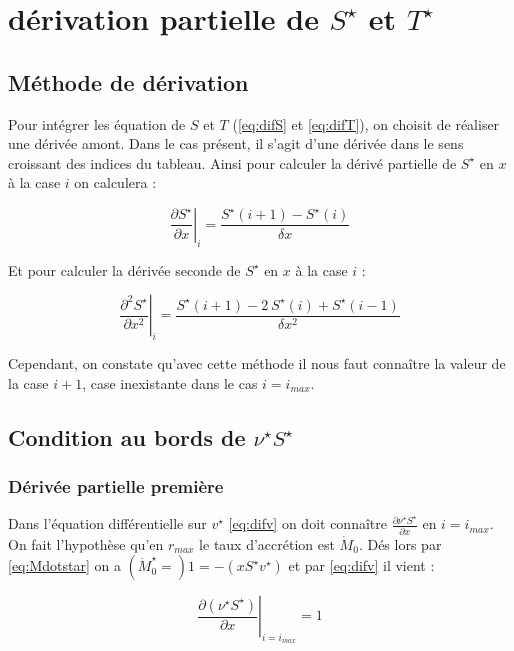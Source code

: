 \section{dérivation partielle  de $S^{\star}$ et $T^{\star}$}

\subsection{Méthode de dérivation}

Pour intégrer les équation de $S$ et $T$ (\eqref{eq:difS} et \eqref{eq:difT}), on choisit de réaliser une dérivée amont. Dans le cas présent, il s'agit d'une dérivée dans le sens croissant des indices du tableau. Ainsi pour calculer la dérivé partielle de $S^{\star}$ en $x$ à la case $i$ on calculera :

\begin{equation}
  \left. \frac{\partial S^{\star}}{\partial x} \right|_i = \frac{S^{\star}(i+1)-S^{\star}(i)}{\delta x} 
\end{equation}

Et pour calculer la dérivée seconde de $S^{\star}$ en $x$ à la case $i$ :

\begin{equation}
  \left. \frac{\partial^2 S^{\star}}{\partial x^2}\right|_i=\frac{S^{\star}(i+1)-2\ S^{\star}(i) +S^{\star}(i-1)}{\delta x^2} 
\end{equation}

Cependant, on constate qu'avec cette méthode il nous faut connaître la valeur de la case $i+1$, case inexistante dans le cas $i=i_{max}$.

\subsection{Condition au bords de $\nu^{\star}S^{\star}$}

\subsubsection{Dérivée partielle première}

Dans l'équation différentielle sur $v^{\star}$ \eqref{eq:difv} on doit connaître $\frac{\partial \nu^{\star} S^{\star}}{\partial x}$ en $i=i_{max}$.
On fait l'hypothèse qu'en $r_{max}$ le taux d'accrétion est $\dot{M}_0$. Dés lors par \eqref{eq:Mdotstar} on a $(\dot{M}^{\star}_0=)1 = -(x S^{\star}v^{\star})$ et par \eqref{eq:difv} il vient :

\begin{equation}
  \label{eq:nuS_n_is_null}
  \left. \frac{\partial (\nu^{\star} S^{\star})}{\partial x}\right|_{i=i_{max}}=1
\end{equation}


